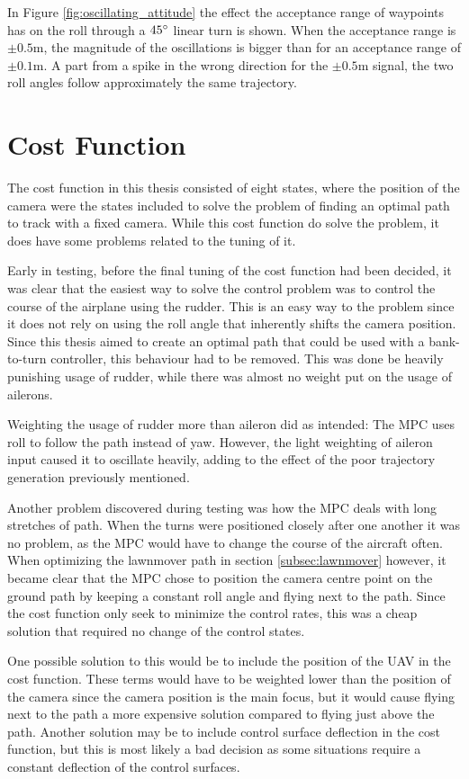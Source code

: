 In Figure \ref{fig:oscillating_attitude} the effect the acceptance range of waypoints has on the roll through a $45\degree$ linear turn is shown. When the acceptance range is $\pm 0.5$m, the magnitude of the oscillations is bigger than for an acceptance range of $\pm 0.1$m. A part from a spike in the wrong direction for the $\pm 0.5$m signal, the two roll angles follow approximately the same trajectory.


\section{Cost Function}

The cost function in this thesis consisted of eight states, where the position of the camera were the states included to solve the problem of finding an optimal path to track with a fixed camera. While this cost function do solve the problem, it does have some problems related to the tuning of it.

Early in testing, before the final tuning of the cost function had been decided, it was clear that the easiest way to solve the control problem was to control the course of the airplane using the rudder. This is an easy way to the problem since it does not rely on using the roll angle that inherently shifts the camera position. Since this thesis aimed to create an optimal path that could be used with a bank-to-turn controller, this behaviour had to be removed. This was done be heavily punishing usage of rudder, while there was almost no weight put on the usage of ailerons.

Weighting the usage of rudder more than aileron did as intended: The MPC uses roll to follow the path instead of yaw. However, the light weighting of aileron input caused it to oscillate heavily, adding to the effect of the poor trajectory generation previously mentioned.

Another problem discovered during testing was how the MPC deals with long stretches of path. When the turns were positioned closely after one another it was no problem, as the MPC would have to change the course of the aircraft often. When optimizing the lawnmover path in section \ref{subsec:lawnmover} however, it became clear that the MPC chose to position the camera centre point on the ground path by keeping a constant roll angle and flying next to the path. Since the cost function only seek to minimize the control rates, this was a cheap solution that required no change of the control states.

One possible solution to this would be to include the position of the UAV in the cost function. These terms would have to be weighted lower than the position of the camera since the camera position is the main focus, but it would cause flying next to the path a more expensive solution compared to flying just above the path. Another solution may be to include control surface deflection in the cost function, but this is most likely a bad decision as some situations require a constant deflection of the control surfaces.


